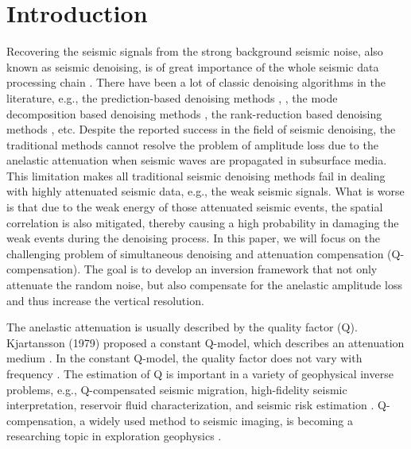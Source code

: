 \section{Introduction}
Recovering the seismic signals from the strong background seismic noise, also known as seismic denoising, is of great importance of the whole seismic data processing chain \cite[]{yanan2014,yanhui2016,amir2017ieee,li2018multidimensional,wang2019hankel}.  There have been a lot of classic denoising algorithms in the literature, e.g., the prediction-based denoising methods \cite[]{canales1984,abma1995}, , the mode decomposition based denoising methods \cite[]{chenwei2012}, the rank-reduction based denoising methods \cite[]{mssa,weilin2016dmssa,zhaoqiang2019tgrs}, etc. Despite the reported success in the field of seismic denoising, the traditional methods cannot resolve the problem of amplitude loss due to the anelastic attenuation when seismic waves are propagated in subsurface media.  This limitation makes all traditional seismic denoising methods fail in dealing with highly attenuated seismic data, e.g., the weak seismic signals. What is worse is that due to the weak energy of those attenuated seismic events, the spatial correlation is also mitigated, thereby causing a high probability in damaging the weak events during the denoising process.  In this paper, we will focus on the challenging problem of simultaneous denoising and attenuation compensation (Q-compensation). The goal is to develop an inversion framework that not only  attenuate the random noise, but also compensate for the anelastic amplitude loss and thus increase the vertical resolution.  

The anelastic attenuation is usually described by the quality factor (Q). Kjartansson (1979) \cite[]{kjartansson1979constant} proposed a constant Q-model, which describes an attenuation medium \cite[]{bickel1985plane,wang2002stable,shen2018q,shen2018q2}. In the constant Q-model, the quality factor does not vary with frequency \cite[]{braginsky1989quality,dai2012multi}. The estimation of Q is important in a variety of geophysical inverse problems, e.g., Q-compensated seismic migration, high-fidelity seismic interpretation, reservoir fluid characterization, and seismic risk estimation \cite[]{mousavi2014jgr,shank2018image,cheng2018q,jyothi2017seismic,luo2019q,chen2019multichannel}. Q-compensation, a widely used method to seismic imaging, is becoming a  researching topic in exploration geophysics \cite[]{guo2017adjoint,zhou2019viscoacoustic,aharchaou2019prestack}. 

